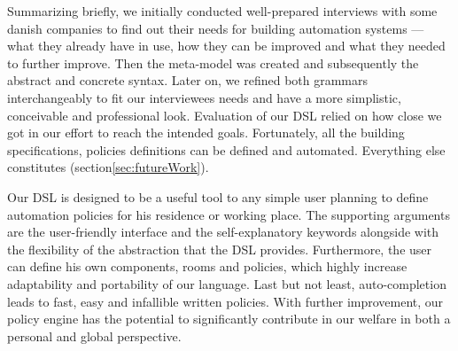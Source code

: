 Summarizing briefly, we initially conducted well-prepared interviews with some danish companies to find out their needs for building automation systems --- what they already have in use, how they can be improved and what they needed to further improve. Then the meta-model was created and subsequently the abstract and concrete syntax. Later on, we refined both grammars interchangeably to fit our interviewees needs and have a more simplistic, conceivable and professional look. Evaluation of our DSL relied on how close we got in our effort to reach the intended goals. Fortunately, all the building specifications, policies definitions can be defined and automated. Everything else constitutes   (section\ref{sec:futureWork}).

Our DSL is designed to be a useful tool to any simple user planning to define automation policies for his residence or working place. The supporting arguments are the user-friendly interface and the self-explanatory keywords alongside with the flexibility of the abstraction that the DSL provides. Furthermore, the user can define his own components, rooms and policies, which highly increase adaptability and portability of our language. Last but not least, auto-completion leads to fast, easy and infallible written policies. With further improvement, our policy engine has the potential to significantly contribute in our welfare in both a personal and global perspective.
